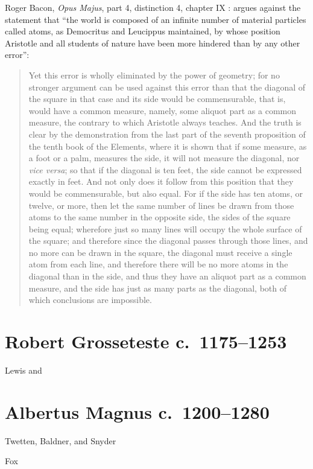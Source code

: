\documentclass{amsart}
\theoremstyle{definition}
\begin{document}
Roger Bacon, {\em Opus Majus}, part 4, distinction 4, chapter IX \cite[p.~173]{baconI}: argues against the statement that ``the world is composed of an infinite number of material
particles called atoms, as Democritus and Leucippus maintained, by whose position Aristotle and all students of nature have been more hindered than by any other error'': 

\begin{quote}
Yet this error is wholly eliminated by the power
of geometry; for no stronger argument can be used against this error than that the diagonal of the square
in that case and its side would be commensurable, that is, would have a common measure, namely, some aliquot part as a common
measure, the contrary to which Aristotle always teaches. And the truth is clear by the demonstration from the last part of the seventh proposition of the tenth book of the
Elements, where it is shown that if some measure, as a foot or a palm, measures the side, it will not measure the diagonal, nor {\em vice versa}; so that if the diagonal
is ten feet, the side cannot be expressed exactly in feet. And not only does it follow
from this position that they would be commensurable, but also equal. For if the side has ten atoms, or twelve, or more, then let the same number of lines
be drawn from those atoms to the same number in the opposite side, the sides of the square being equal; wherefore just so many lines will occupy the whole
surface of the square; and therefore since the diagonal passes through those lines, and no more can be drawn in the square, the diagonal must receive a single atom from each
line, and therefore there will be no more atoms in the diagonal than in the side, and thus they have an aliquot part as a common measure, and the side has just as many parts
as the diagonal, both of which conclusions are impossible.
\end{quote}


\section{Robert Grosseteste c.~1175--1253}
Lewis \cite{lewis2005} and \cite{lewis2012}



\section{Albertus Magnus c.~1200--1280}
Twetten, Baldner, and Snyder \cite{snyder}

Fox \cite{fox}
\end{document}
